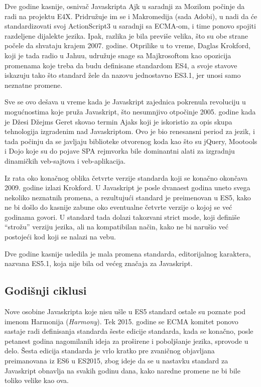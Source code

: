 Dve godine kasnije, osnivač Javaskripta Ajk u saradnji za Mozilom počinje da radi na projektu E4X.
Pridružuje im se i Makromedija (sada Adobi), u nadi da će standardizovati svoj ActionScript3 u saradnji sa ECMA-om, i time ponovo spojiti razdeljene dijalekte jezika.
Ipak, razlika je bila previše velika, što su obe strane počele da shvataju krajem 2007. godine.
Otprilike u to vreme, Daglas Krokford, koji je tada radio u Jahuu, udružuje snage sa Majkrosoftom kao opozicija promenama koje treba da budu definisane standardom ES4, a svoje stavove iskazuju tako što standard žele da nazovu jednostavno ES3.1, jer unosi samo neznatne promene.

Sve se ovo dešava u vreme kada je Javaskript zajednica pokrenula revoluciju u mogućnostima koje pruža Javaskript, što nesumnjivo otpočinje 2005. godine
kada je Džesi Džejms Geret skovao termin Ajaks koji je iskoristio za opis skupa tehnologija izgradenim nad Javaskriptom.
Ovo je bio renesansni period za jezik, i tada počinju da se javljaju biblioteke otvorenog koda kao što su jQuery, Mootools i Dojo koje su do pojave SPA  rejmvorka bile dominantni alati za izgradnju dinamičkih veb-sajtova i veb-aplikacija.

Iz rata oko konačnog oblika četvrte verzije standarda koji se konačno okončava 2009. godine izlazi Krokford.
U Javaskript je posle dvanaest godina uneto svega nekoliko neznatnih promena, a rezultujući standard je preimenovan u ES5, kako ne bi došlo do kasnije zabune oko eventualne četvrte verzije o kojoj se već godinama govori.
U standard tada dolazi takozvani strict mode, koji definiše “strožu” verziju jezika, ali na kompatibilan način, kako ne bi narušio već postojeći kod koji se nalazi na vebu.

Dve godine kasnije usledila je mala promena standarda, editorijalnog karaktera, nazvana ES5.1, koja nije bila od većeg značaja za Javaskript.

\subsection{Godišnji ciklusi}

Nove osobine Javaskripta koje nisu ušle u ES5 standard ostale su poznate pod imenom Harmonija (\textsl{Harmony}).
Tek 2015. godine se ECMA komitet ponovo sastaje radi definisanja standarda šeste edicije standarda, kada se konačno, posle petanest godina nagomilanih ideja za proširene i poboljšanje jezika, sprovode u delo.
Šesta edicija standarda je vrlo kratko pre zvaničnog objavljana preimanovana iz ES6 u ES2015, zbog ideje da se u nastavku standard za Javaskript obnavlja na svakih godinu dana, kako naredne promene ne bi bile toliko velike kao ova.

